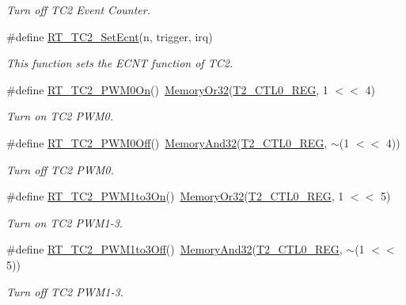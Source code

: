 \begin{DoxyCompactItemize}
\begin{DoxyCompactList}\small\item\em Turn off T\+C2 Event Counter. \end{DoxyCompactList}\item 
\#define \mbox{\hyperlink{a00047_af07bf5769df0423324194f22e008e832}{R\+T\+\_\+\+T\+C2\+\_\+\+Set\+Ecnt}}(n,  trigger,  irq)
\begin{DoxyCompactList}\small\item\em This function sets the E\+C\+NT function of T\+C2. \end{DoxyCompactList}\item 
\#define \mbox{\hyperlink{a00047_abaff3048e72dc0cb912c898a0a4c4e14}{R\+T\+\_\+\+T\+C2\+\_\+\+P\+W\+M0\+On}}()~\mbox{\hyperlink{a00020_a27874a97deab7cecdde5ddecf466e31e}{Memory\+Or32}}(\mbox{\hyperlink{a00020_a5853553391e986211306d4f29ab31e47}{T2\+\_\+\+C\+T\+L0\+\_\+\+R\+EG}}, 1 $<$$<$ 4)
\begin{DoxyCompactList}\small\item\em Turn on T\+C2 P\+W\+M0. \end{DoxyCompactList}\item 
\#define \mbox{\hyperlink{a00047_a52f984fc9f5bc4d1821025ad8d75f3c9}{R\+T\+\_\+\+T\+C2\+\_\+\+P\+W\+M0\+Off}}()~\mbox{\hyperlink{a00020_ad87cedffcaadc51db22594fce55173d4}{Memory\+And32}}(\mbox{\hyperlink{a00020_a5853553391e986211306d4f29ab31e47}{T2\+\_\+\+C\+T\+L0\+\_\+\+R\+EG}}, $\sim$(1 $<$$<$ 4))
\begin{DoxyCompactList}\small\item\em Turn off T\+C2 P\+W\+M0. \end{DoxyCompactList}\item 
\#define \mbox{\hyperlink{a00047_adc090dee2463a2a27b57234e63f0c0b5}{R\+T\+\_\+\+T\+C2\+\_\+\+P\+W\+M1to3\+On}}()~\mbox{\hyperlink{a00020_a27874a97deab7cecdde5ddecf466e31e}{Memory\+Or32}}(\mbox{\hyperlink{a00020_a5853553391e986211306d4f29ab31e47}{T2\+\_\+\+C\+T\+L0\+\_\+\+R\+EG}}, 1 $<$$<$ 5)
\begin{DoxyCompactList}\small\item\em Turn on T\+C2 P\+W\+M1-\/3. \end{DoxyCompactList}\item 
\#define \mbox{\hyperlink{a00047_adec1566e2c2a16ab922163a22f3c99df}{R\+T\+\_\+\+T\+C2\+\_\+\+P\+W\+M1to3\+Off}}()~\mbox{\hyperlink{a00020_ad87cedffcaadc51db22594fce55173d4}{Memory\+And32}}(\mbox{\hyperlink{a00020_a5853553391e986211306d4f29ab31e47}{T2\+\_\+\+C\+T\+L0\+\_\+\+R\+EG}}, $\sim$(1 $<$$<$ 5))
\begin{DoxyCompactList}\small\item\em Turn off T\+C2 P\+W\+M1-\/3. \end{DoxyCompactList}\item 

\end{DoxyCompactItemize}
